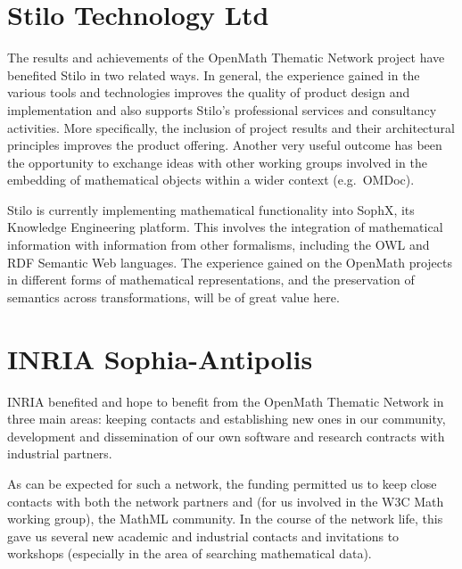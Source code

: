 \section{Stilo Technology Ltd}

The results and achievements of the OpenMath Thematic Network project
have benefited Stilo in two related ways. In general, the experience
gained in the various tools and technologies improves the quality of
product design and implementation and also supports Stilo's professional
services and consultancy activities. More specifically, the inclusion of
project results and their architectural principles improves the product
offering.  Another very useful outcome has been the opportunity to
exchange ideas with other working groups involved in the embedding of
mathematical objects within a wider context (e.g.~OMDoc).
 
Stilo is currently implementing mathematical functionality into SophX,
its Knowledge Engineering platform. This involves the integration of
mathematical information with information from other formalisms,
including the OWL and RDF Semantic Web languages. The experience gained
on the OpenMath projects in different forms of mathematical
representations, and the preservation of semantics across
transformations, will be of great value here.


\section{INRIA Sophia-Antipolis}

INRIA benefited and hope to benefit from the OpenMath Thematic Network
in three main areas:  keeping contacts and establishing new ones in our
community, development and dissemination of our own software and
research contracts with industrial partners.
                                                                                
As can be expected for such a network, the funding permitted us to keep
close contacts with both the network partners and (for us involved in
the W3C Math working group), the MathML community. In the course of the
network life, this gave us several new academic and industrial contacts
and invitations to workshops (especially in the area of searching
mathematical data).

